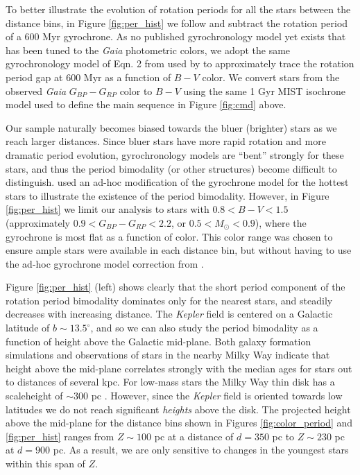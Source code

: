 \documentclass[preprint2]{aastex62}
\newcommand{\Kepler}{\textsl{Kepler}\xspace}
\begin{document}
To better illustrate the evolution of rotation periods for all the stars between the distance bins, in Figure \ref{fig:per_hist} we follow \citet{davenport2017} and subtract the rotation period of a 600 Myr gyrochrone. As no published gyrochronology model yet exists that has been tuned to the {\em Gaia} photometric colors, we adopt the same gyrochronology model of Eqn. 2 from \citet{meibom2009} used by \citet{davenport2017} to approximately trace the rotation period gap at 600 Myr as a function of $B-V$ color. We convert stars from the observed {\em Gaia} $G_{BP}-G_{RP}$ color to $B-V$ using the same 1 Gyr MIST isochrone model used to define the main sequence in Figure \ref{fig:cmd} above. 

Our sample naturally becomes biased towards the bluer (brighter) stars as we reach larger distances. Since bluer stars have more rapid rotation and more dramatic period evolution, gyrochronology models are ``bent'' strongly for these stars, and thus the period bimodality (or other structures) become difficult to distinguish. \citet{davenport2017} used an ad-hoc modification of the gyrochrone model for the hottest stars to illustrate the existence of the period bimodality. However, in Figure \ref{fig:per_hist} we limit our analysis to stars with $0.8<B-V<1.5$ (approximately $0.9<G_{BP}-G_{RP}<2.2$, or $0.5<M_\odot< 0.9$), where the gyrochrone is most flat as a function of color. This color range was chosen to ensure ample stars were available in each distance bin, but without having to use the ad-hoc gyrochrone model correction from \citet{davenport2017}.



Figure \ref{fig:per_hist} (left) shows clearly that the short period component of the rotation period bimodality dominates only for the nearest stars, and steadily decreases with increasing distance.
The \Kepler field is centered on a Galactic latitude of $b\sim13.5^\circ$, and so we can also study the period bimodality as a function of height above the Galactic mid-plane.
Both galaxy formation simulations \citep{ma2017} and observations of stars in the nearby Milky Way \citep{xiang2017} indicate that height above the mid-plane correlates strongly with the median ages for stars out to distances of several kpc. For low-mass stars the Milky Way thin disk has a scaleheight of $\sim$300 pc \citep{gilmore1983}.
However, since the \Kepler field is oriented towards low latitudes we do not reach significant {\it heights} above the disk.
The projected height above the mid-plane for the distance bins shown in Figures \ref{fig:color_period} and \ref{fig:per_hist} ranges from $Z\sim100$ pc at a distance of $d=350$ pc to $Z\sim230$ pc at $d=900$ pc. As a result, we are only sensitive to changes in the youngest stars within this span of $Z$.
\end{document}
